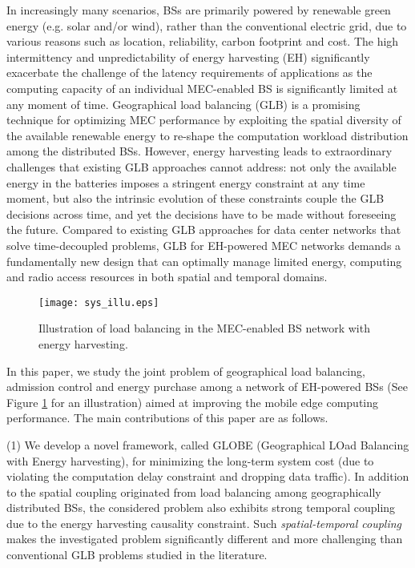 \documentclass[12pt, draftclsnofoot, letterpaper, onecolumn]{IEEEtran}
\begin{document}
In increasingly many scenarios, BSs are primarily powered by renewable green energy (e.g. solar and/or wind), rather than the conventional electric grid, due to various reasons such as location, reliability, carbon footprint and cost. The high intermittency and unpredictability of energy harvesting (EH) \cite{ulukus2015energy} significantly exacerbate the challenge of the latency requirements of applications as the computing capacity of an individual MEC-enabled BS is significantly limited at any moment of time. Geographical load balancing (GLB) \cite{lin2012online,islam2015water} is a promising technique for optimizing MEC performance by exploiting the spatial diversity of the available renewable energy to re-shape the computation workload distribution among the distributed BSs. However, energy harvesting leads to extraordinary challenges that existing GLB approaches cannot address: not only the available energy in the batteries imposes a stringent energy constraint at any time moment, but also the intrinsic evolution of these constraints couple the GLB decisions across time, and yet the decisions have to be made without foreseeing the future. Compared to existing GLB approaches for data center networks that solve time-decoupled problems, GLB for EH-powered MEC networks demands a fundamentally new design that can optimally manage limited energy, computing and radio access resources in both spatial and temporal domains.

\begin{figure}
  \centering
  \texttt{[image: sys\_illu.eps]}\\
  \caption{Illustration of load balancing in the MEC-enabled BS network with energy harvesting.}\label{sys_illu}
  \vspace{-20pt}
\end{figure}



In this paper, we study the joint problem of geographical load balancing, admission control and energy purchase among a network of EH-powered BSs (See Figure \ref{sys_illu} for an illustration) aimed at improving the mobile edge computing performance. The main contributions of this paper are as follows.

(1) We develop a novel framework, called GLOBE (Geographical LOad Balancing with Energy harvesting), for minimizing the long-term system cost (due to violating the computation delay constraint and dropping data traffic). In addition to the spatial coupling originated from load balancing among geographically distributed BSs, the considered problem also exhibits strong temporal coupling due to the energy harvesting causality constraint. Such \emph{spatial-temporal coupling} makes the investigated problem significantly different and more challenging than conventional GLB problems studied in the literature.
\end{document}
